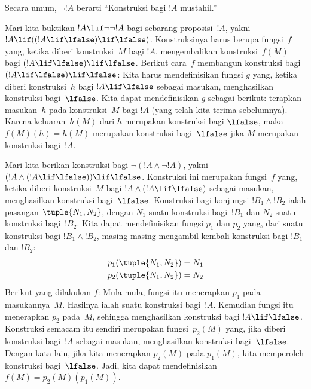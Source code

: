 \documentclass[../../../include/open-logic-section]{subfiles}
\begin{document}
Secara umum, $\lnot !A$ berarti ``Konstruksi bagi $!A$ mustahil.''

\begin{ex}
Mari kita buktikan $!A \lif \lnot \lnot !A$ bagi sebarang proposisi~$!A$,
yakni $!A \lif ((!A \lif \lfalse) \lif \lfalse)$. Konstruksinya harus berupa
fungsi~$f$ yang, ketika diberi konstruksi~$M$ bagi $!A$, mengembalikan
konstruksi~$f(M)$ bagi $(!A \lif \lfalse) \lif \lfalse$. Berikut cara~$f$
membangun konstruksi bagi $(!A \lif \lfalse) \lif \lfalse$: Kita harus
mendefinisikan fungsi $g$ yang, ketika diberi konstruksi~$h$ bagi $!A \lif
\lfalse$ sebagai masukan, menghasilkan konstruksi bagi~$\lfalse$. Kita dapat
mendefinisikan $g$ sebagai berikut: terapkan masukan~$h$ pada konstruksi~$M$
bagi $!A$ (yang telah kita terima sebelumnya). Karena keluaran~$h(M)$ dari $h$
merupakan konstruksi bagi $\lfalse$, maka $f(M)(h) = h(M)$ merupakan konstruksi
bagi~$\lfalse$ jika $M$ merupakan konstruksi bagi~$!A$.
\end{ex}

\begin{ex}
Mari kita berikan konstruksi bagi $\lnot(!A \land \lnot !A)$, yakni $(!A
\land (!A \lif \lfalse)) \lif \lfalse$. Konstruksi ini merupakan fungsi~$f$
yang, ketika diberi konstruksi~$M$ bagi $!A \land (!A \lif \lfalse)$ sebagai
masukan, menghasilkan konstruksi bagi~$\lfalse$. Konstruksi bagi konjungsi
$!B_1 \land !B_2$ ialah pasangan $\tuple{N_1, N_2}$, dengan $N_1$ suatu
konstruksi bagi~$!B_1$ dan $N_2$ suatu konstruksi bagi~$!B_2$. Kita dapat
mendefinisikan fungsi $p_1$ dan $p_2$ yang, dari suatu konstruksi bagi
$!B_1 \land !B_2$, masing-masing mengambil kembali konstruksi bagi $!B_1$
dan $!B_2$:
\begin{align*}
  p_1(\tuple{N_1, N_2}) &= N_1\\
  p_2(\tuple{N_1, N_2}) &= N_2
\end{align*}
Berikut yang dilakukan $f$: Mula-mula, fungsi itu menerapkan $p_1$ pada
masukannya~$M$. Hasilnya ialah suatu konstruksi bagi~$!A$. Kemudian fungsi itu
menerapkan $p_2$ pada~$M$, sehingga menghasilkan konstruksi bagi $!A \lif
\lfalse$. Konstruksi semacam itu sendiri merupakan fungsi~$p_2(M)$ yang, jika
diberi konstruksi bagi~$!A$ sebagai masukan, menghasilkan konstruksi
bagi~$\lfalse$. Dengan kata lain, jika kita menerapkan $p_2(M)$ pada $p_1(M)$,
kita memperoleh konstruksi bagi~$\lfalse$. Jadi, kita dapat mendefinisikan
$f(M) = p_2(M)(p_1(M))$.
\end{ex}
\end{document}
